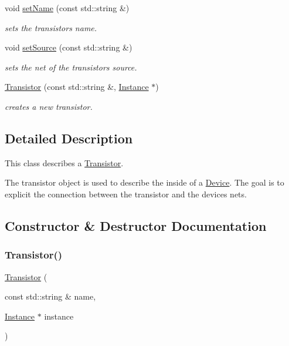 \begin{DoxyCompactItemize}
void \mbox{\hyperlink{class_open_chams_1_1_transistor_a36c59a26f0317be12cea01f8dea24ec7}{set\+Name}} (const std\+::string \&)
\begin{DoxyCompactList}\small\item\em sets the transistor\textquotesingle{}s name. \end{DoxyCompactList}\item 
void \mbox{\hyperlink{class_open_chams_1_1_transistor_abc4a5d86e639ea13e27551722e2f9c17}{set\+Source}} (const std\+::string \&)
\begin{DoxyCompactList}\small\item\em sets the net of the transistor\textquotesingle{}s source. \end{DoxyCompactList}\item 
\mbox{\hyperlink{class_open_chams_1_1_transistor_a5052d5c281f8798a0b10ebfe4c0296a5}{Transistor}} (const std\+::string \&, \mbox{\hyperlink{class_open_chams_1_1_instance}{Instance}} $\ast$)
\begin{DoxyCompactList}\small\item\em creates a new transistor. \end{DoxyCompactList}\end{DoxyCompactItemize}


\subsection{Detailed Description}
This class describes a \mbox{\hyperlink{class_open_chams_1_1_transistor}{Transistor}}.

The transistor object is used to describe the inside of a \mbox{\hyperlink{class_open_chams_1_1_device}{Device}}. The goal is to explicit the connection between the transistor and the device\textquotesingle{}s nets. 

\subsection{Constructor \& Destructor Documentation}
\mbox{\label{class_open_chams_1_1_transistor_a5052d5c281f8798a0b10ebfe4c0296a5}} 
\subsubsection{\texorpdfstring{Transistor()}{Transistor()}}
{\footnotesize\ttfamily \mbox{\hyperlink{class_open_chams_1_1_transistor}{Transistor}} (\begin{DoxyParamCaption}\item[{const std\+::string \&}]{name,  }\item[{\mbox{\hyperlink{class_open_chams_1_1_instance}{Instance}} $\ast$}]{instance }\end{DoxyParamCaption})}



